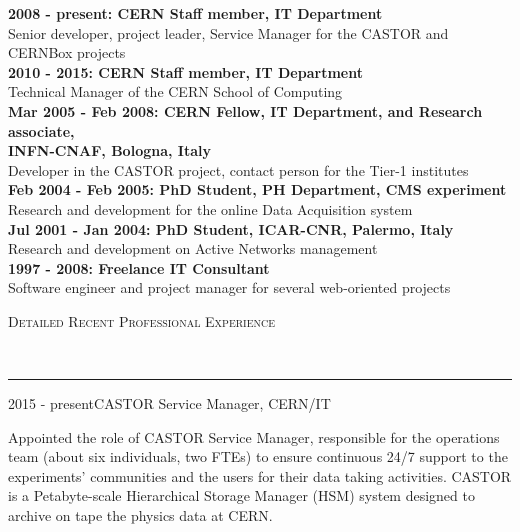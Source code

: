 \documentclass[11pt]{article}
\renewcommand{\section}[2]%
        {\vspace{1.3\baselineskip}%
         \hspace{0in}%
         {\raggedright \scshape #1}\\[-0.15\baselineskip]%
                 \rule{\columnwidth}{1pt}%
        \vspace{.5\baselineskip}%
         \hspace{0in}
}
\renewcommand{\subsection}[2]%
        {
         {\bf{\raggedright \scshape #1}}{\bf{\hfill \scshape #2}}\\[-.7\baselineskip]
}
\begin{document}
\textbf{2008 - present: CERN Staff member, IT Department}\\
Senior developer, project leader, Service Manager for the CASTOR and CERNBox projects\\[.3\baselineskip]
\textbf{2010 - 2015: CERN Staff member, IT Department}\\
Technical Manager of the CERN School of Computing\\[.3\baselineskip]
\textbf{Mar 2005 - Feb 2008: CERN Fellow, IT Department, and Research associate,\\ INFN-CNAF, Bologna, Italy}\\
Developer in the CASTOR project, contact person for the Tier-1 institutes\\[.3\baselineskip]
\textbf{Feb 2004 - Feb 2005: PhD Student, PH Department, CMS experiment}\\
Research and development for the online Data Acquisition system\\[.3\baselineskip]
\textbf{Jul 2001 - Jan 2004: PhD Student, ICAR-CNR, Palermo, Italy}\\
Research and development on Active Networks management\\[.3\baselineskip]
\textbf{1997 - 2008: Freelance IT Consultant}\\
Software engineer and project manager for several web-oriented projects


\section{Detailed Recent Professional Experience}

\subsection{2015 - present}{CASTOR Service Manager, CERN/IT}

Appointed the role of CASTOR Service Manager, responsible for the operations team (about six individuals, two FTEs) to ensure continuous 24/7 support to the experiments' communities and the users for their data taking activities.
CASTOR is a Petabyte-scale Hierarchical Storage Manager (HSM) system designed to archive on tape the physics data at CERN.
\end{document}
